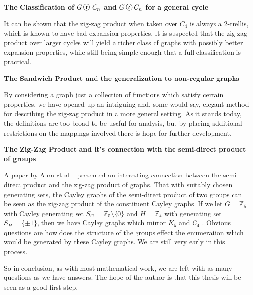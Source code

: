 \vspace{2ex}
\noindent
{\bf The Classification of $G \replacement C_n$ and $G \zigzag C_n$ for a general cycle}
\vspace{2ex}

It can be shown that the zig-zag product when taken over $C_4$ is always a $2$-trellis, which is known to have bad expansion properties. It is suspected that the zig-zag product over larger cycles will yield a richer class of graphs with possibly better expansion properties, while still being simple enough that a full classification is practical.

\vspace{2ex}
\noindent
{\bf The Sandwich Product and the generalization to non-regular graphs}
\vspace{2ex}

By considering a graph just a collection of functions which satisfy certain properties, we have opened up an intriguing and, some would say, elegant method for describing the zig-zag product in a more general setting. As it stands today, the definitions are too broad to be useful for analysis, but by placing additional restrictions on the mappings involved there is
hope for further development.

\vspace{2ex}
\noindent
{\bf The Zig-Zag Product and it’s connection with the semi-direct product of groups} \vspace{2ex}

A paper by Alon {et al.}~\cite{Alon:2001xy} presented an interesting connection between the semi-direct product and the zig-zag product of graphs. That with suitably chosen generating sets, the Cayley graphs of the semi-direct product of two groups can be seen as the zig-zag product of the constituent Cayley graphs. If we let $G = \mathbb{Z}_5$ with Cayley generating set $S_G = \mathbb{Z}_5 \setminus \{0\}$
and $H = \mathbb{Z}_4$ with generating set $S_H = \{\pm1\}$, then we have Cayley graphs which mirror $K_5$ and $C_4$ . Obvious questions are how does the structure of the groups effect the enumeration which would be generated by these Cayley graphs. We are still very early in this process.

So in conclusion, as with most mathematical work, we are left with as many questions as we have answers. The hope of the author is that this thesis will be seen as a good first step.


